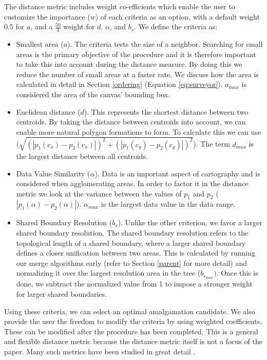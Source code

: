 The distance metric includes weight co-efficients which enable the user to customize the importance ($w$) of each criteria as an option, with a default weight 0.5 for $a$, and a $\frac{50}{3}$ weight for $d$, $\alpha$, and $b_s$.
We define the criteria as:
\begin{itemize}
\item Smallest area ($a$). The criteria tests the size of a neighbor. Searching for small areas is the primary objective of the procedure and it is therefore important to take this into account during the distance measure. By doing this we reduce the number of small areas  at a faster rate. We discuss how the area is calculated in detail in Section \ref{ordering} (Equation \ref{eq:surveyor}). $a_{max}$ is considered the area of the canvas' bounding box.
\item Euclidean distance ($d$). This represents the shortest distance between two centroids. By taking the distance between centroids into account, we can enable  more natural polygon formations to form. To calculate this we can use ($\sqrt{(|p_1(c_x)-p_2(c_x)|)^2+(|p_1(c_y)-p_2(c_y)|)^2}$). The term $d_{max}$ is the largest distance between all centroids. 
\item Data Value Similarity ($\alpha$). Data is an important aspect of cartography and is considered when agglomerating areas. In order to factor it in the distance metric we look at the variance between the values of $p_1$ and $p_2$ ($|p_1(\alpha) - p_2(\alpha)|$). $\alpha_{max}$ is the largest data value in the data range.
\item Shared Boundary Resolution ($b_s$). Unlike the other criterion, we favor a larger shared boundary resolution. The shared boundary resolution refers to the topological length of a shared boundary, where a larger shared boundary defines a closer unification between two areas. This is calculated by running our merge algorithms early (refer to Section \ref{parent} for more detail) and normalizing it over the largest resolution area in the tree ($b_{s_{max}})$. Once this is done, we subtract the normalized value from 1 to impose a stronger weight for larger shared boundaries.
\end{itemize}

Using these criteria, we can select an optimal amalgamation candidate. We also provide the user the freedom to modify the criteria by using weighted coefficients. These can be modified after the procedure has been completed. This is a general and flexible distance metric because the distance metric itself is not a focus of the paper. Many such metrics have been studied in great detail \cite{elmqvist2010hierarchical}. %

